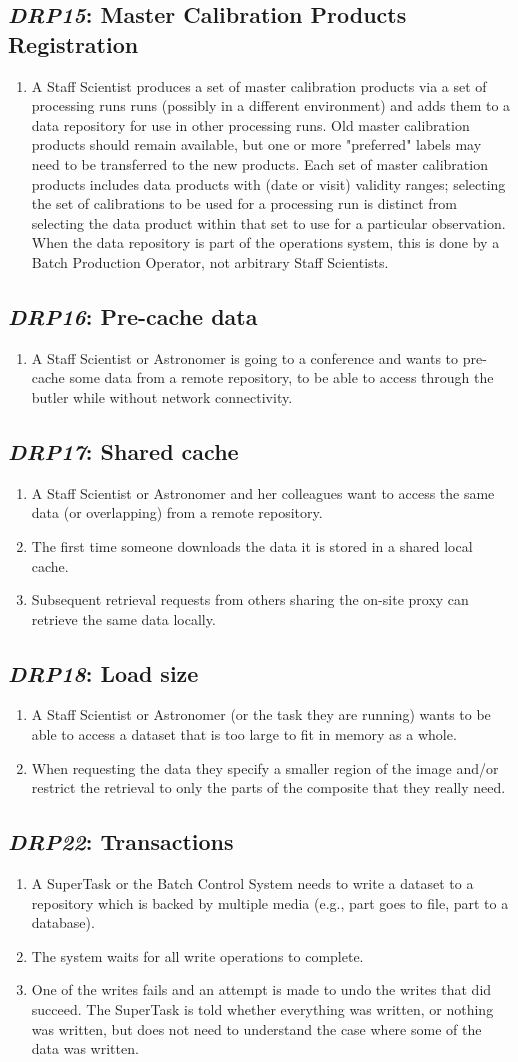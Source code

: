 \documentclass[DM,toc,lsstdraft]{lsstdoc}
\newcommand{\usecase}[3]{%
\subsection{\emph{#1}: #2}
\label{use:#1}
\begin{enumerate}[label=\alph*.]
#3
\end{enumerate}
}
\begin{document}
\usecase{DRP15}{Master Calibration Products Registration}{%

\item
A Staff Scientist produces a set of master calibration products via a set of processing runs runs (possibly in a different environment) and adds them to a data repository for use in other processing runs.
Old master calibration products should remain available, but one or more "preferred" labels may need to be transferred to the new products.
Each set of master calibration products includes data products with (date or visit) validity ranges; selecting the set of calibrations to be used for a processing run is distinct from selecting the data product within that set to use for a particular observation.
When the data repository is part of the operations system, this is done by a Batch Production Operator, not arbitrary Staff Scientists.
}

\usecase{DRP16}{Pre-cache data}{%

\item
A Staff Scientist or Astronomer is going to a conference and wants to pre-cache some data from a remote repository, to be able to access through the butler while without network connectivity.
}

\usecase{DRP17}{Shared cache}{%

\item
A Staff Scientist or Astronomer and her colleagues want to access the same data (or overlapping) from a remote repository.

\item
The first time someone downloads the data it is stored in a shared local cache.

\item
Subsequent retrieval requests from others sharing the on-site proxy can retrieve the same data locally.

}

\usecase{DRP18}{Load size}{%

\item
A Staff Scientist or Astronomer (or the task they are running) wants to be able to access a dataset that is too large to fit in memory as a whole.

\item
When requesting the data they specify a smaller region of the image and/or restrict the retrieval to only the parts of the composite that they really need.

}

\usecase{DRP22}{Transactions}{%

\item
A SuperTask or the Batch Control System needs to write a dataset to a repository which is backed by multiple media (e.g., part goes to file, part to a database).

\item
The system waits for all write operations to complete.

\item
One of the writes fails and an attempt is made to undo the writes that did succeed.
The SuperTask is told whether everything was written, or nothing was written, but does not need to understand the case where some of the data was written.

}
\end{document}
